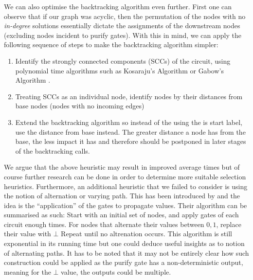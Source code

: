 We can also optimise the backtracking algorithm even further.
First one can observe that if our graph was acyclic, then
the permutation of the nodes with no \textit{in-degree} solutions essentially
dictate the assignments of the downstream nodes (excluding nodes incident
to purify gates). With this in mind, we can apply the following sequence
of steps to make the backtracking algorithm simpler:
\begin{enumerate}
    \item Identify the strongly connected components (SCCs) of the circuit, using polynomial
          time algorithms such as Kosaraju's Algorithm \cite{sharir_StrongconnectivityAlgorithmIts_1981} 
          or Gabow's Algorithm \cite{gabow_PathbasedDepthfirstSearch_2000}. 
    \item Treating SCCs as an individual node, identify nodes by their distances from
          base nodes (nodes with no incoming edges)
    \item Extend the backtracking algorithm so instead of the using the is start label,
          use the distance from base instead. The greater distance a node has from the
          base, the less impact it has and therefore should be postponed in later stages of the
          backtracking calls.
\end{enumerate}

We argue that the above heuristic may result in improved average times but of course
further research can be done in order to determine more suitable selection heuristics.
Furthermore, an additional heuristic that we failed to consider is using the notion
of alternation or varying path.
This has been introduced by \cite{eichelberger_HazardDetectionCombinational_1965}
and the idea is the ``application'' of the gates to propagate values.
Their algorithm can be summarised as such:
Start with an initial set of nodes, and apply gates of each circuit enough times.
For nodes that alternate their values between $0,1$, replace their value with $\bot$
Repeat until no altrenation occurs. This algorithm is still exponential
in its running time but one could deduce useful insights as to notion
of alternating paths.
It has to be noted that it may not be entirely clear how such construction
could be applied as the purify gate has a non-deterministic output, meaning
for the $\bot$ value, the outputs could be multiple.
